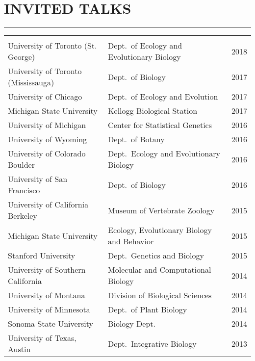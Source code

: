 \documentclass{article}
\begin{document}
\section*{INVITED TALKS}
\vspace{-0.6cm}
\rule{470pt}{0.4pt}
%
\begin{tabular}{>{\everypar{\hangindent1cm}}p{}p{}p{}}
\hfill\\
University of Toronto (St. George) & Dept.\ of Ecology and Evolutionary Biology & \hfill 2018 \\
%
University of Toronto (Mississauga) & Dept.\ of Biology & \hfill 2017 \\
%
University of Chicago & Dept.\ of Ecology and Evolution & \hfill 2017 \\
%
Michigan State University & Kellogg Biological Station & \hfill 2017 \\
%
University of Michigan & Center for Statistical Genetics & \hfill 2016 \\
%
University of Wyoming & Dept.\ of Botany & \hfill 2016 \\
%
University of Colorado Boulder & Dept.\ Ecology and Evolutionary Biology & \hfill 2016 \\
%
University of San Francisco & Dept.\ of Biology & \hfill 2016 \\
%
University of California Berkeley & Museum of Vertebrate Zoology & \hfill 2015 \\
%
Michigan State University & Ecology, Evolutionary Biology and Behavior & \hfill 2015 \\
%
Stanford University & Dept.\ Genetics and Biology & \hfill 2015 \\
%
University of Southern California & Molecular and Computational Biology & \hfill 2014 \\
%
University of Montana & Division of Biological Sciences & \hfill 2014 \\
%
University of Minnesota & Dept.\ of Plant Biology & \hfill 2014 \\
%
Sonoma State University & Biology Dept.\ & \hfill 2014 \\
%
University of Texas, Austin & Dept.\ Integrative Biology & \hfill 2013 \\
%
\end{tabular}
%
\end{document}
